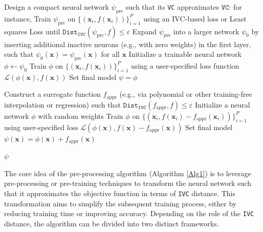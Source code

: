 \documentclass[final]{siamart220329}
\newtheorem{theoretical insights}{Theoretical insights}
\newtheorem{practical takeaway}{Practical takeaway}
\begin{document}
{{{{\begin{algorithm}
\begin{algorithmic}[1]
    \State Design a compact neural network \( \psi_{\text{pre}} \) such that its \texttt{VC}  approximates \( \widehat{\texttt{VC}} \): {\color{black}for instance, }
    Train \( \psi_{\text{pre}} \) on \( \{(\bm{x}_i, f(\bm{x}_i))\}_{i=1}^P \) using an IVC-based loss {\color{black}or Least squares Loss} until 
    \(
    \texttt{Dist}_{\texttt{IVC}}(\psi_{\text{pre}}, f) \leq \varepsilon
    \) 
    \State Expand \( \psi_{\text{pre}} \) into a larger network \( \psi_0 \) by inserting additional inactive neurons (e.g., with zero weights) in the first layer, such that \( \psi_0(\bm{x}) = \psi_{\text{pre}}(\bm{x}) \) for all \( \bm{x} \)
    \State Initialize a trainable neural network \( \phi \leftarrow \psi_0 \)
    \State Train \( \phi \) on \( \{(\bm{x}_i, f(\bm{x}_i))\}_{i=1}^P \) using a user-specified loss function \( \mathcal{L}(\phi(\bm{x}), f(\bm{x})) \)
    \State Set final model \( \psi = \phi \)

    \State Construct a surrogate function \( f_{\text{appr}} \) (e.g., via polynomial or other training-free interpolation or regression) such that
    \(
    \texttt{Dist}_{\texttt{IVC}}(f_{\text{appr}}, f) \leq \varepsilon
    \)
    \State Initialize a neural network \( \phi\) with random weights
    \State Train \( \phi \) on \( \{(\bm{x}_i, f(\bm{x}_i) - f_{\text{appr}}(\bm{x}_i))\}_{i=1}^P \) using user-specified loss \( \mathcal{L}(\phi(\bm{x}), f(\bm{x}) - f_{\text{appr}}(\bm{x})) \)
    \State Set final model \( \psi(\bm{x}) = \phi(\bm{x}) + f_{\text{appr}}(\bm{x}) \)

\EndIf

\State \Return \( \psi \)
\end{algorithmic}
\end{algorithm}




 The core idea of the pre-processing algorithm (Algorithm \ref{Alg1}) is to leverage pre-processing or pre-training techniques to transform the neural network such that it approximates the objective function in terms of \texttt{IVC} distance. This transformation aims to simplify the subsequent training process, either by reducing training time or improving accuracy. Depending on the role of the \texttt{IVC} distance, the algorithm can be divided into two distinct frameworks.

}}}}
\end{document}
